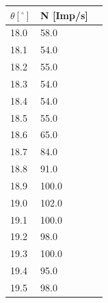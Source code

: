 \begin{minipage}{\linewidth}
    \begin{table}[H]
        \centering
    \begin{tabular}{lll}
        \toprule
        $\theta [^\circ]$ & N [Imp/s] \\
        \midrule
        18.0  & 58.0 \\
        18.1  & 54.0 \\
        18.2  & 55.0 \\
        18.3  & 54.0 \\
        18.4  & 54.0 \\
        18.5  & 55.0 \\
        18.6  & 65.0 \\
        18.7  & 84.0 \\
        18.8  & 91.0 \\
        18.9  & 100.0 \\
        19.0  & 102.0 \\
        19.1  & 100.0 \\
        19.2  & 98.0 \\
        19.3  & 100.0 \\
        19.4  & 95.0 \\ 
        19.5  & 98.0 \\
        \bottomrule   
    \end{tabular}
    
    \label{tab:7}
\end{table}
\end{minipage}